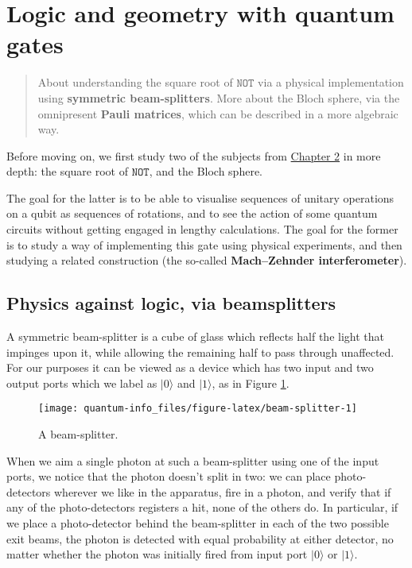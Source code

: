 \documentclass[fleqn]{article}
\let\oldsection\section
\renewcommand\section{\clearpage\oldsection}
\begin{document}
\hypertarget{chapter3}{%
\section{Logic and geometry with quantum gates}\label{chapter3}}

\begin{quote}
About understanding the square root of \(\texttt{NOT}\) via a physical implementation using \textbf{symmetric beam-splitters}.
More about the Bloch sphere, via the omnipresent \textbf{Pauli matrices}, which can be described in a more algebraic way.
\end{quote}

Before moving on, we first study two of the subjects from \protect\hyperlink{chapter2}{Chapter 2} in more depth: the square root of \(\texttt{NOT}\), and the Bloch sphere.

The goal for the latter is to be able to visualise sequences of unitary operations on a qubit as sequences of rotations, and to see the action of some quantum circuits without getting engaged in lengthy calculations.
The goal for the former is to study a way of implementing this gate using physical experiments, and then studying a related construction (the so-called \textbf{Mach--Zehnder interferometer}).

\hypertarget{physics-against-logic-via-beamsplitters}{%
\subsection{Physics against logic, via beamsplitters}\label{physics-against-logic-via-beamsplitters}}

A symmetric beam-splitter is a cube of glass which reflects half the light that impinges upon it, while allowing the remaining half to pass through unaffected.
For our purposes it can be viewed as a device which has two input and two output ports which we label as \(|0\rangle\) and \(|1\rangle\), as in Figure \ref{fig:beam-splitter}.

\begin{figure}[H]

{\centering \texttt{[image: quantum-info\_files/figure-latex/beam-splitter-1]} 

}

\caption{A beam-splitter.}\label{fig:beam-splitter}
\end{figure}

When we aim a single photon at such a beam-splitter using one of the input ports, we notice that the photon doesn't split in two: we can place photo-detectors wherever we like in the apparatus, fire in a photon, and verify that if any of the photo-detectors registers a hit, none of the others do.
In particular, if we place a photo-detector behind the beam-splitter in each of the two possible exit beams, the photon is detected with equal probability at either detector, no matter whether the photon was initially fired from input port \(|0\rangle\) or \(|1\rangle\).
\end{document}
